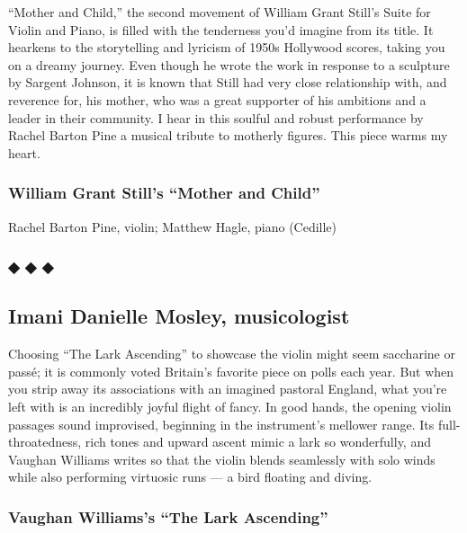 ``Mother and Child,'' the second movement of William Grant Still's Suite
for Violin and Piano, is filled with the tenderness you'd imagine from
its title. It hearkens to the storytelling and lyricism of 1950s
Hollywood scores, taking you on a dreamy journey. Even though he wrote
the work in response to a sculpture by Sargent Johnson, it is known that
Still had very close relationship with, and reverence for, his mother,
who was a great supporter of his ambitions and a leader in their
community. I hear in this soulful and robust performance by Rachel
Barton Pine a musical tribute to motherly figures. This piece warms my
heart.

\hypertarget{william-grant-stills-mother-and-child}{%
\subsubsection{William Grant Still's ``Mother and
Child''}\label{william-grant-stills-mother-and-child}}

Rachel Barton Pine, violin; Matthew Hagle, piano (Cedille)

\hypertarget{---9}{%
\subsubsection{◆ ◆ ◆}\label{---9}}

\hypertarget{imani-danielle-mosley-musicologist}{%
\subsection{Imani Danielle Mosley,
musicologist}\label{imani-danielle-mosley-musicologist}}

Choosing ``The Lark Ascending'' to showcase the violin might seem
saccharine or passé; it is commonly voted Britain's favorite piece on
polls each year. But when you strip away its associations with an
imagined pastoral England, what you're left with is an incredibly joyful
flight of fancy. In good hands, the opening violin passages sound
improvised, beginning in the instrument's mellower range. Its
full-throatedness, rich tones and upward ascent mimic a lark so
wonderfully, and Vaughan Williams writes so that the violin blends
seamlessly with solo winds while also performing virtuosic runs --- a
bird floating and diving.

\hypertarget{vaughan-williamss-the-lark-ascending}{%
\subsubsection{Vaughan Williams's ``The Lark
Ascending''}\label{vaughan-williamss-the-lark-ascending}}

